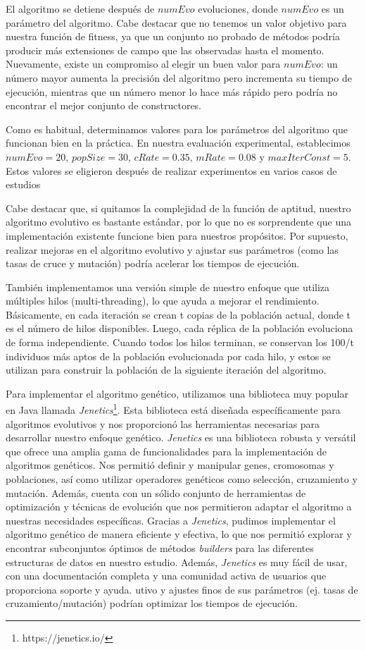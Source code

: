 El algoritmo se detiene después de $numEvo$ evoluciones, donde $numEvo$ es un parámetro del algoritmo. 
Cabe destacar que no tenemos un valor objetivo para nuestra función de fitness, 
ya que un conjunto no probado de métodos podría producir más extensiones de campo que las observadas hasta el momento. 
Nuevamente, existe un compromiso al elegir un buen valor para $numEvo$: un número mayor aumenta la precisión del algoritmo pero incrementa su tiempo de ejecución, 
mientras que un número menor lo hace más rápido pero podría no encontrar el mejor conjunto de constructores.

Como es habitual, determinamos valores para los parámetros del algoritmo que funcionan bien en la práctica. 
En nuestra evaluación experimental, establecimos $numEvo=20$, $popSize=30$, $cRate=0.35$, $mRate=0.08$ 
y $maxIterConst=5$. Estos valores se eligieron después de realizar experimentos en varios casos de estudios

Cabe destacar que, si quitamos la complejidad de la función de aptitud, nuestro algoritmo evolutivo es bastante estándar, por lo que no es sorprendente que una implementación existente funcione bien para nuestros propósitos. Por supuesto, realizar mejoras en el algoritmo evolutivo y ajustar sus parámetros (como las tasas de cruce y mutación) podría acelerar los tiempos de ejecución.

También implementamos una versión simple de nuestro enfoque que utiliza múltiples hilos (multi-threading), lo que ayuda a mejorar el rendimiento. Básicamente, en cada iteración se crean t copias de la población actual, donde t es el número de hilos disponibles. Luego, cada réplica de la población evoluciona de forma independiente. Cuando todos los hilos terminan, se conservan los 100/t individuos más aptos de la población evolucionada por cada hilo, y estos se utilizan para construir la población de la siguiente iteración del algoritmo.

Para implementar el algoritmo genético, utilizamos una biblioteca muy popular en Java llamada \emph{Jenetics}\footnote{https://jenetics.io/}. Esta biblioteca está diseñada específicamente para algoritmos evolutivos y nos proporcionó las herramientas necesarias para desarrollar nuestro enfoque genético.
\emph{Jenetics} es una biblioteca robusta y versátil que ofrece una amplia gama de funcionalidades para la implementación de algoritmos genéticos. Nos permitió definir y manipular genes, cromosomas y poblaciones, así como utilizar operadores genéticos como selección, cruzamiento y mutación. Además, cuenta con un sólido conjunto de herramientas de optimización y técnicas de evolución que nos permitieron adaptar el algoritmo a nuestras necesidades específicas.
Gracias a \emph{Jenetics}, pudimos implementar el algoritmo genético de manera eficiente y efectiva, lo que nos permitió explorar y encontrar subconjuntos óptimos de métodos \emph{builders} para las diferentes estructuras de datos en nuestro estudio. Además, \emph{Jenetics} es muy fácil de usar, con una documentación completa y una comunidad activa de usuarios que proporciona soporte y ayuda.
utivo y ajustes finos de sus parámetros (ej. tasas de cruzamiento/mutación) podrían optimizar los tiempos de ejecución.


